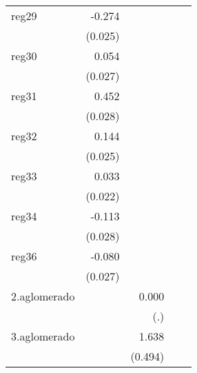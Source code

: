 {\begin{longtable}{l*{4}{D{.}{.}{-1}}}
\addlinespace
reg29       &      -0.274\sym{***}&                     &                     &                     \\
            &     (0.025)         &                     &                     &                     \\
\addlinespace
reg30       &       0.054\sym{*}  &                     &                     &                     \\
            &     (0.027)         &                     &                     &                     \\
\addlinespace
reg31       &       0.452\sym{***}&                     &                     &                     \\
            &     (0.028)         &                     &                     &                     \\
\addlinespace
reg32       &       0.144\sym{***}&                     &                     &                     \\
            &     (0.025)         &                     &                     &                     \\
\addlinespace
reg33       &       0.033         &                     &                     &                     \\
            &     (0.022)         &                     &                     &                     \\
\addlinespace
reg34       &      -0.113\sym{***}&                     &                     &                     \\
            &     (0.028)         &                     &                     &                     \\
\addlinespace
reg36       &      -0.080\sym{**} &                     &                     &                     \\
            &     (0.027)         &                     &                     &                     \\
\addlinespace
2.aglomerado&                     &       0.000         &                     &                     \\
            &                     &         (.)         &                     &                     \\
\addlinespace
3.aglomerado&                     &       1.638\sym{***}&                     &                     \\
            &                     &     (0.494)         &                     &                     \\

\end{longtable}}
